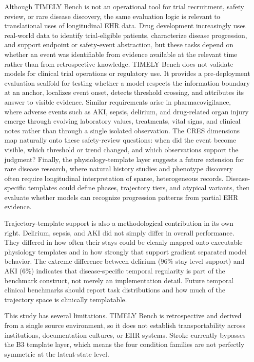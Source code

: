 \documentclass[pdflatex,sn-nature]{sn-jnl}
\begin{document}
Although TIMELY Bench is not an operational tool for trial recruitment, safety review, or rare disease discovery, the same evaluation logic is relevant to translational uses of longitudinal EHR data. Drug development increasingly uses real-world data to identify trial-eligible patients, characterize disease progression, and support endpoint or safety-event abstraction, but these tasks depend on whether an event was identifiable from evidence available at the relevant time rather than from retrospective knowledge\cite{fda2023rwe,richesson2013ehrphenotyping}. TIMELY Bench does not validate models for clinical trial operations or regulatory use. It provides a pre-deployment evaluation scaffold for testing whether a model respects the information boundary at an anchor, localizes event onset, detects threshold crossing, and attributes its answer to visible evidence. Similar requirements arise in pharmacovigilance, where adverse events such as AKI, sepsis, delirium, and drug-related organ injury emerge through evolving laboratory values, treatments, vital signs, and clinical notes rather than through a single isolated observation\cite{wang2009pharmacovigilance,harpaz2012adverseevent}. The CRES dimensions map naturally onto these safety-review questions: when did the event become visible, which threshold or trend changed, and which observations support the judgment? Finally, the physiology-template layer suggests a future extension for rare disease research, where natural history studies and phenotype discovery often require longitudinal interpretation of sparse, heterogeneous records\cite{fda2019rarediseasehistory,bastarache2018phers}. Disease-specific templates could define phases, trajectory tiers, and atypical variants, then evaluate whether models can recognize progression patterns from partial EHR evidence.

Trajectory-template support is also a methodological contribution in its own right. Delirium, sepsis, and AKI did not simply differ in overall performance. They differed in how often their stays could be cleanly mapped onto executable physiology templates and in how strongly that support gradient separated model behavior. The extreme difference between delirium (96\% stay-level support) and AKI (6\%) indicates that disease-specific temporal regularity is part of the benchmark construct, not merely an implementation detail. Future temporal clinical benchmarks should report task distributions and how much of the trajectory space is clinically templatable.

This study has several limitations. TIMELY Bench is retrospective and derived from a single source environment, so it does not establish transportability across institutions, documentation cultures, or EHR systems. Stroke currently bypasses the B3 template layer, which means the four condition families are not perfectly symmetric at the latent-state level.
\end{document}
